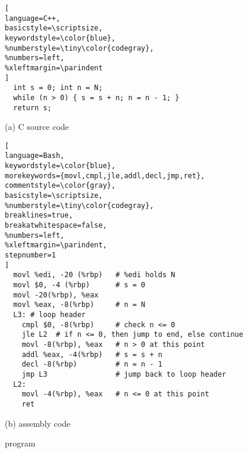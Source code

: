 \begin{figure}
\begin{lstlisting}[
language=C++, 
basicstyle=\scriptsize,
keywordstyle=\color{blue},
%numberstyle=\tiny\color{codegray},
%numbers=left,
%xleftmargin=\parindent
]
  int s = 0; int n = N;
  while (n > 0) { s = s + n; n = n - 1; }
  return s;
\end{lstlisting}
\begin{center}
{\small (a) C source code}
\end{center}
\begin{lstlisting}[
language=Bash,
keywordstyle=\color{blue},
morekeywords={movl,cmpl,jle,addl,decl,jmp,ret},
commentstyle=\color{gray},
basicstyle=\scriptsize,
%numberstyle=\tiny\color{codegray},
breaklines=true,
breakatwhitespace=false,
%numbers=left,
%xleftmargin=\parindent,
stepnumber=1
]
  movl %edi, -20 (%rbp)   # %edi holds N
  movl $0, -4 (%rbp)      # s = 0
  movl -20(%rbp), %eax
  movl %eax, -8(%rbp)     # n = N
  L3: # loop header  
    cmpl $0, -8(%rbp)     # check n <= 0
    jle L2  # if n <= 0, then jump to end, else continue
    movl -8(%rbp), %eax   # n > 0 at this point
    addl %eax, -4(%rbp)   # s = s + n
    decl -8(%rbp)         # n = n - 1
    jmp L3                # jump back to loop header
  L2:
    movl -4(%rbp), %eax   # n <= 0 at this point
    ret
\end{lstlisting}
\begin{center}
{\small (b) \ISA assembly code}
\end{center}
\caption{ program}
\label{fig:sum2n}
\end{figure}

